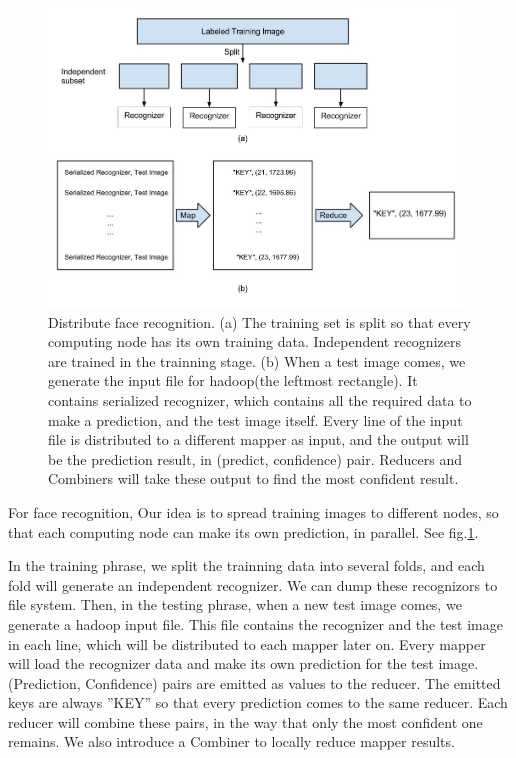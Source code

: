 \documentclass[11pt, draftclsnofoot, onecolumn]{IEEEtran}
\begin{document}
\begin{figure}
\centering
\includegraphics[height=300]{recog_overview}
\caption{Distribute face recognition. (a) The training set is split so that every computing node has its own training data. Independent recognizers are trained in the trainning stage. (b) When a test image comes, we generate the input file for hadoop(the leftmost rectangle). It contains serialized recognizer, which contains all the required data to make a prediction, and the test image itself. Every line of the input file is distributed to a different mapper as input, and the output will be the prediction result, in (predict, confidence) pair. Reducers and Combiners will take these output to find the most confident result.}
\label{fig:recog_overview}
\end{figure}

For face recognition, Our idea is to spread training images to different nodes, so that each computing node can make its own prediction, in parallel. See fig.\ref{fig:recog_overview}. 

In the training phrase, we split the trainning data into several folds, and each fold will generate an independent recognizer. We can dump these recognizors to file system. Then, in the testing phrase, when a new test image comes, we generate a hadoop input file. This file contains the recognizer and the test image in each line, which will be distributed to each mapper later on. Every mapper will load the recognizer data and make its own prediction for the test image. (Prediction, Confidence) pairs are emitted as values to the reducer. The emitted keys are always ''KEY'' so that every prediction comes to the same reducer. Each reducer will combine these pairs, in the way that only the most confident one remains. We also introduce a Combiner to locally reduce mapper results. 
\end{document}
